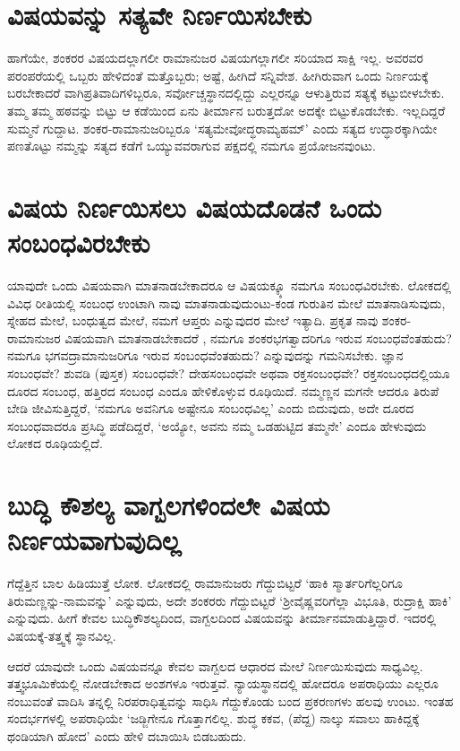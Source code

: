 \section*{ವಿಷಯವನ್ನು ಸತ್ಯವೇ ನಿರ್ಣಯಿಸಬೇಕು}

ಹಾಗೆಯೇ, ಶಂಕರರ ವಿಷಯದಲ್ಲಾಗಲೀ ರಾಮಾನುಜರ ವಿಷಯಗಲ್ಲಾಗಲೀ ಸರಿಯಾದ ಸಾಕ್ಷಿ ಇಲ್ಲ. ಅವರವರ ಪರಂಪರೆಯಲ್ಲಿ ಒಬ್ಬರು ಹೇಳಿದಂತೆ ಮತ್ತೊಬ್ಬರು; ಅಷ್ಟೆ, ಹೀಗಿದೆ ಸನ್ನಿವೇಶ. ಹೀಗಿರುವಾಗ ಒಂದು ನಿರ್ಣಯಕ್ಕೆ ಬರಬೇಕಾದರೆ ವಾಗಿಪ್ರತಿವಾದಿಗಳಿಬ್ಬರೂ, ಸರ್ವೋಚ್ಚಸ್ಥಾನದಲ್ಲಿದ್ದು ಎಲ್ಲರನ್ನೂ ಆಳುತ್ತಿರುವ ಸತ್ಯಕ್ಕೆ ಕಟ್ಟುಬೀಳಬೇಕು. ತಮ್ಮ ತಮ್ಮ ಹಠವನ್ನು ಬಿಟ್ಟು ಆ ಕಡೆಯಿಂದ ಏನು ತೀರ್ಮಾನ ಬರುತ್ತದೋ ಅದಕ್ಕೇ ಬಿಟ್ಟುಕೊಡಬೇಕು. ಇಲ್ಲದಿದ್ದರೆ ಸುಮ್ಮನೆ ಗುದ್ದಾಟ. ಶಂಕರ-ರಾಮಾನುಜರಿಬ್ಬರೂ `ಸತ್ಯಮೇವೋದ್ಧರಾಮ್ಯಹಮ್' ಎಂದು ಸತ್ಯದ ಉದ್ಧಾರಕ್ಕಾಗಿಯೇ ಪಣತೊಟ್ಟು ನಮ್ಮನ್ನು ಸತ್ಯದ ಕಡೆಗೆ ಒಯ್ಯುವವರಾಗುವ ಪಕ್ಷದಲ್ಲಿ ನಮಗೂ ಪ್ರಯೋಜನವುಂಟು.

\section*{ವಿಷಯ ನಿರ್ಣಯಿಸಲು ವಿಷಯದೊಡನೆ ಒಂದು ಸಂಬಂಧವಿರಬೇಕು}

ಯಾವುದೇ ಒಂದು ವಿಷಯವಾಗಿ ಮಾತನಾಡಬೇಕಾದರೂ ಆ ವಿಷಯಕ್ಕ್ಕೂ ನಮಗೂ ಸಂಬಂಧವಿರಬೇಕು. ಲೋಕದಲ್ಲಿ ವಿವಿಧ ರೀತಿಯಲ್ಲಿ ಸಂಬಂಧ ಉಂಟಾಗಿ ನಾವು ಮಾತನಾಡುವುದುಂಟು-ಕಂಡ ಗುರುತಿನ ಮೇಲೆ ಮಾತನಾಡಿಸುವುದು, ಸ್ನೇಹದ ಮೇಲೆ, ಬಂಧುತ್ವದ ಮೇಲೆ, ನಮಗೆ ಆಪ್ತರು ಎನ್ನುವುದರ ಮೇಲೆ ಇತ್ಯಾದಿ. ಪ್ರಕೃತ ನಾವು ಶಂಕರ-ರಾಮಾನುಜರ ವಿಷಯವಾಗಿ ಮಾತನಾಡಬೇಕಾದರೆ , ನಮಗೂ ಶಂಕರಭಗತ್ವಾದರಿಗೂ ಇರುವ ಸಂಬಂಧವೆಂತಹುದು? ನಮಗೂ ಭಗವದ್ರಾಮಾನುಜರಿಗೂ ಇರುವ ಸಂಬಂಧವೆಂತಹುದು? ಎನ್ನುವುದನ್ನು ಗಮನಿಸಬೇಕು. ಜ್ಞಾನ ಸಂಬಂಧವೇ? ಶುವಡಿ (ಪುಸ್ತಕ) ಸಂಬಂಧವೇ? ದೇಹಸಂಬಂಧವೇ ಅಥವಾ ರಕ್ತಸಂಬಂಧವೇ? ರಕ್ತಸಂಬಂಧದಲ್ಲಿಯೂ ದೂರದ ಸಂಬಂಧ, ಹತ್ತಿರದ ಸಂಬಂಧ ಎಂದೂ ಹೇಳಿಕೊಳ್ಳುವ ರೂಢಿಯಿದೆ. ನಮ್ಮಣ್ಣನ ಮಗನೇ ಆದರೂ ತಿರುಪೆ ಬೇಡಿ ಜೀವಿಸುತ್ತಿದ್ದರೆ, `ನಮಗೂ ಅವನಿಗೂ ಅಷ್ಟೇನೂ ಸಂಬಂಧವಿಲ್ಲ' ಎಂದು ಬಿದುವುದು, ಅದೇ ದೂರದ ಸಂಬಂಧವಾದರೂ ಪ್ರಸಿದ್ಧಿ ಪಡೆದಿದ್ದರೆ, `ಅಯ್ಯೋ, ಅವನು ನಮ್ಮ ಒಡಹುಟ್ಟಿದ ತಮ್ಮನೇ' ಎಂದೂ ಹೇಳುವುದು ಲೋಕದ ರೂಢಿಯಲ್ಲಿದೆ.

\section*{ಬುದ್ಧಿ ಕೌಶಲ್ಯ ವಾಗ್ಬಲಗಳಿಂದಲೇ ವಿಷಯ ನಿರ್ಣಯವಾಗುವುದಿಲ್ಲ}

ಗೆದ್ದೆತ್ತಿನ ಬಾಲ ಹಿಡಿಯುತ್ತೆ ಲೋಕ. ಲೋಕದಲ್ಲಿ ರಾಮಾನುಜರು ಗೆದ್ದುಬಿಟ್ಟರೆ `ಹಾಕಿ ಸ್ಮಾರ್ತರಿಗೆಲ್ಲರಿಗೂ ತಿರುಮಣ್ಣನ್ನು-ನಾಮವನ್ನು' ಎನ್ನುವುದು, ಅದೇ ಶಂಕರರು ಗೆದ್ದುಬಿಟ್ಟರೆ `ಶ್ರೀವೈಷ್ಣವರಿಗೆಲ್ಲಾ ವಿಭೂತಿ, ರುದ್ರಾಕ್ಷಿ ಹಾಕಿ' ಎನ್ನುವುದು. ಹೀಗೆ ಕೇವಲ ಬುದ್ಧಿಕೌಶಲ್ಯದಿಂದ, ವಾಗ್ಬಲದಿಂದ ವಿಷಯವನ್ನು  ತೀರ್ಮಾನಮಾಡುತ್ತಿದ್ದಾರೆ. ಇದರಲ್ಲಿ ವಿಷಯಕ್ಕೆ-ತತ್ತ್ವಕ್ಕೆ ಸ್ಥಾನವಿಲ್ಲ.

ಆದರೆ ಯಾವುದೇ ಒಂದು ವಿಷಯವನ್ನೂ ಕೇವಲ ವಾಗ್ಬಲದ ಆಧಾರದ ಮೇಲೆ ನಿರ್ಣಯಿಸುವುದು ಸಾಧ್ಯವಿಲ್ಲ. ತತ್ತ್ವಭೂಮಿಕೆಯಲ್ಲಿ ನೋಡಬೇಕಾದ ಅಂಶಗಳೂ ಇರುತ್ತವೆ. ನ್ಯಾಯಸ್ಥಾನದಲ್ಲಿ ಹೋದರೂ ಅಪರಾಧಿಯು ಎಲ್ಲರೂ ನಂಬುವಂತೆ ವಾದಿಸಿ ತನ್ನಲ್ಲಿ ನಿರಪರಾಧಿತ್ವವನ್ನು ಸಾಧಿಸಿ ಗೆದ್ದುಕೊಂಡು ಬಂದ ಪ್ರಕರಣಗಳು ಹಲವು ಉಂಟು. ಇಂತಹ ಸಂದರ್ಭಗಳಲ್ಲಿ ಅಪರಾಧಿಯೇ `ಜಡ್ಜಿಗೇನೂ ಗೊತ್ತಾಗಲಿಲ್ಲ. ಶುದ್ಧ ಕಕವ, (ಪೆದ್ದ) ನಾಲ್ಕು ಸವಾಲು ಹಾಕಿದ್ದಕ್ಕೆ ಥಂಡಿಯಾಗಿ ಹೋದ' ಎಂದು ಹೇಳಿ ದಬಾಯಿಸಿ ಬಿಡಬಹುದು.

